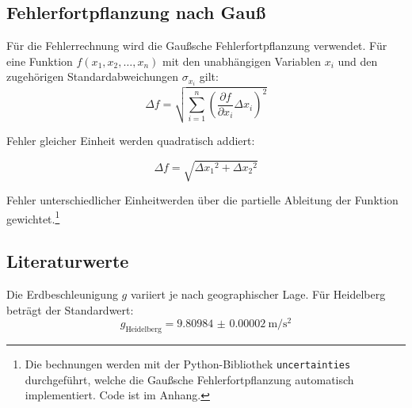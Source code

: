\documentclass[12pt,a4paper,titlepage]{scrartcl}
\numberwithin{equation}{section}
\numberwithin{table}{section}
\numberwithin{figure}{section}
\begin{document}
\subsection{Fehlerfortpflanzung nach Gauß}
Für die Fehlerrechnung wird die Gaußsche Fehlerfortpflanzung verwendet. Für eine Funktion $f(x_1, x_2, \dots, x_n)$ mit den unabhängigen Variablen $x_i$ und den zugehörigen Standardabweichungen $\sigma_{x_i}$ gilt:
\begin{equation}
    \Delta f = \sqrt{\sum_{i=1}^{n} \left(\frac{\partial f}{\partial x_i} \Delta{x_i}\right)^2}
\end{equation}

Fehler gleicher Einheit werden quadratisch addiert:

\begin{equation}
    \Delta f = \sqrt{\Delta{x_1}^2 + \Delta{x_2}^2}
\end{equation}

Fehler unterschiedlicher Einheitwerden über die partielle Ableitung der Funktion gewichtet.\footnote{Die bechnungen werden mit der Python-Bibliothek \texttt{uncertainties} durchgeführt, welche die Gaußsche Fehlerfortpflanzung automatisch implementiert. Code ist im Anhang.}


\subsection{Literaturwerte}

Die Erdbeschleunigung $g$ variiert je nach geographischer Lage. Für Heidelberg beträgt der Standardwert:
\begin{equation}
    g_{\text{Heidelberg}} = \qty{9.80984(2)}{\meter\per\second\squared}
\end{equation}


    

\end{document}
